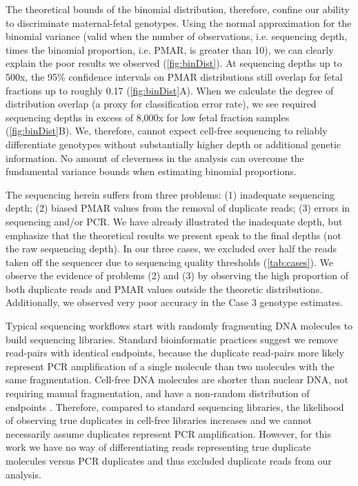 \documentclass{article}\usepackage[]{graphicx}\usepackage[]{color}
\begin{document}
The theoretical bounds of the binomial distribution, therefore, confine our ability to discriminate maternal-fetal genotypes.
Using the normal approximation for the binomial variance (valid when the number of observations, i.e. sequencing depth, times the binomial proportion, i.e. PMAR, is greater than 10), we can clearly explain the poor results we observed (\cref{fig:binDist}).
At sequencing depths up to 500x, the 95\% confidence intervals on PMAR distributions still overlap for fetal fractions up to roughly 0.17 (\cref{fig:binDist}A).
When we calculate the degree of distribution overlap (a proxy for classification error rate), we see required sequencing depths in excess of 8,000x for low fetal fraction samples (\cref{fig:binDist}B).
We, therefore, cannot expect cell-free sequencing to reliably differentiate genotypes without substantially higher depth or additional genetic information.
No amount of cleverness in the analysis can overcome the fundamental variance bounds when estimating binomial proportions.

The sequencing herein suffers from three problems: (1) inadequate sequencing depth; (2) biased PMAR values from the removal of duplicate reads; (3) errors in sequencing and/or PCR.
We have already illustrated the inadequate depth, but emphasize that the theoretical results we present speak to the final depths (not the raw sequencing depth).
In our three cases, we excluded over half the reads taken off the sequencer due to sequencing quality thresholds (\cref{tab:cases}).
We observe the evidence of problems (2) and (3) by observing the high proportion of both duplicate reads and PMAR values outside the theoretic distributions.
Additionally, we observed very poor accuracy in the Case 3 genotype estimates.

Typical sequencing workflows start with randomly fragmenting DNA molecules to build sequencing libraries.
Standard bioinformatic practices suggest we remove read-pairs with identical endpoints, because the duplicate read-pairs more likely represent PCR amplification of a single molecule than two molecules with the same fragmentation.
Cell-free DNA molecules are shorter than nuclear DNA, not requiring manual fragmentation, and have a non-random distribution of endpoints \cite{chan:2016aa}.
Therefore, compared to standard sequencing libraries, the likelihood of observing true duplicates in cell-free libraries increases and we cannot necessarily assume duplicates represent PCR amplification.
However, for this work we have no way of differentiating reads representing true duplicate molecules versus PCR duplicates and thus excluded duplicate reads from our analysis.
\end{document}
